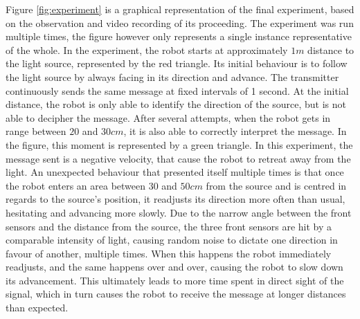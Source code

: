 Figure \ref{fig:experiment} is a graphical representation of the final experiment, based on the observation and video recording of its proceeding.
The experiment was run multiple times, the figure however only represents a single instance representative of the whole.
In the experiment, the robot starts at approximately $1 m$ distance to the light source, represented by the red triangle.
Its initial behaviour is to follow the light source by always facing in its direction and advance.
The transmitter continuously sends the same message at fixed intervals of 1 second.
At the initial distance, the robot is only able to identify the direction of the source, but is not able to decipher the message.
After several attempts, when the robot gets in range between $20$ and $30 cm$, it is also able to correctly interpret the message.
In the figure, this moment is represented by a green triangle.
In this experiment, the message sent is a negative velocity, that cause the robot to retreat away from the light.
An unexpected behaviour that presented itself multiple times is that once the robot enters an area between $30$ and $50 cm$ from the source and is centred in regards to the source's position, it readjusts its direction more often than usual, hesitating and advancing more slowly.
Due to the narrow angle between the front sensors and the distance from the source, the three front sensors are hit by a comparable intensity of light, causing random noise to dictate one direction in favour of another, multiple times.
When this happens the robot immediately readjusts, and the same happens over and over, causing the robot to slow down its advancement.
This ultimately leads to more time spent in direct sight of the signal, which in turn causes the robot to receive the message at longer distances than expected.










